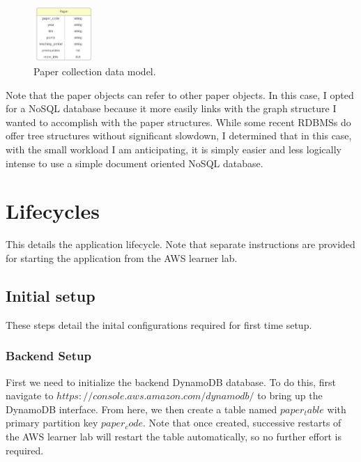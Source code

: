 \documentclass[12pt]{article}
\begin{document}
\begin{figure}
    \caption{Paper collection data model.}
    \label{fig: paper_data_model}
    \begin{center}
        \includegraphics[width=0.2\textwidth]{../docs-assets/paper_erd.PNG}
    \end{center}
\end{figure}

Note that the paper objects can refer to other paper objects. In this case, I opted for a NoSQL database because it more easily links with the graph structure I wanted to accomplish with the paper structures. While some recent RDBMSs do offer tree structures without significant slowdown, I determined that in this case, with the small workload I am anticipating, it is simply easier and less logically intense to use a simple document oriented NoSQL database.

\section{Lifecycles}

This details the application lifecycle. Note that separate instructions are provided for starting the application from the AWS learner lab. 

\subsection{Initial setup}

These steps detail the inital configurations required for first time setup.

\subsubsection{Backend Setup}

First we need to initialize the backend DynamoDB database. To do this, first navigate to $https://console.aws.amazon.com/dynamodb/$ to bring up the DynamoDB interface. From here, we then create a table named $paper_table$ with primary partition key $paper_code$. Note that once created, successive restarts of the AWS learner lab will restart the table automatically, so no further effort is required. 
\end{document}
